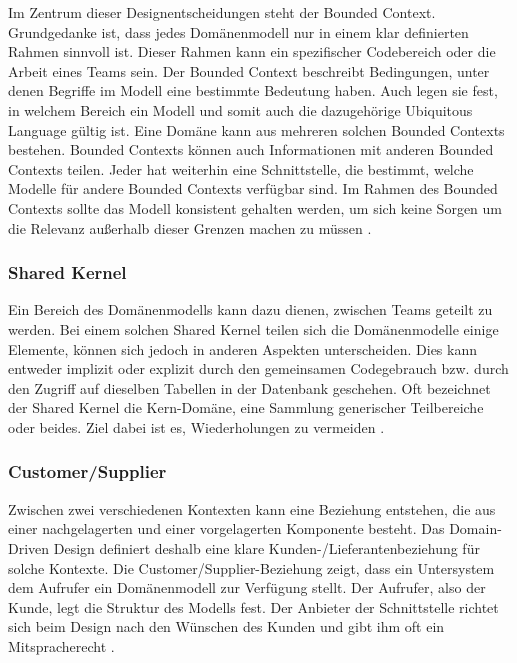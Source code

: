 {Im Zentrum dieser Designentscheidungen steht der \glqq Bounded Context\grqq{}. Grundgedanke ist, dass jedes Domänenmodell nur in einem klar definierten Rahmen sinnvoll ist. Dieser Rahmen kann ein spezifischer Codebereich oder die Arbeit eines Teams sein. Der Bounded Context beschreibt Bedingungen, unter denen Begriffe im Modell eine bestimmte Bedeutung haben. Auch legen sie fest, in welchem Bereich ein Modell und somit auch die dazugehörige Ubiquitous Language gültig ist. Eine Domäne kann aus mehreren solchen Bounded Contexts bestehen. Bounded Contexts können auch Informationen mit anderen Bounded Contexts teilen. Jeder hat weiterhin eine Schnittstelle, die bestimmt, welche Modelle für andere Bounded Contexts verfügbar sind. Im Rahmen des Bounded Contexts sollte das Modell konsistent gehalten werden, um sich keine Sorgen um die Relevanz außerhalb dieser Grenzen machen zu müssen \cite[S. 45]{wolff} \cite[S.57]{newman} \cite[S. 335 - 340]{evans} \cite[S.64-65]{dowalil}.

\subsubsection{Shared Kernel}

Ein Bereich des Domänenmodells kann dazu dienen, zwischen Teams geteilt zu werden. Bei einem solchen \glqq Shared Kernel\grqq{} teilen sich die Domänenmodelle einige Elemente, können sich jedoch in anderen Aspekten unterscheiden. Dies kann entweder implizit oder explizit durch den gemeinsamen Codegebrauch bzw. durch den Zugriff auf dieselben Tabellen in der Datenbank geschehen. Oft bezeichnet der Shared Kernel die Kern-Domäne, eine Sammlung generischer Teilbereiche oder beides. Ziel dabei ist es, Wiederholungen zu vermeiden \cite[S. 354 - 355]{evans} \cite[S. 45]{wolff} \cite[S.65]{dowalil}.

\subsubsection{Customer/Supplier}

Zwischen zwei verschiedenen Kontexten kann eine Beziehung entstehen, die aus einer nachgelagerten und einer vorgelagerten Komponente besteht. Das Domain-Driven Design definiert deshalb eine klare Kunden-/Lieferantenbeziehung für solche Kontexte. Die \glqq Customer/Supplier\grqq{}-Beziehung zeigt, dass ein Untersystem dem Aufrufer ein Domänenmodell zur Verfügung stellt. Der Aufrufer, also der Kunde, legt die Struktur des Modells fest. Der Anbieter der Schnittstelle richtet sich beim Design nach den Wünschen des Kunden und gibt ihm oft ein Mitspracherecht \cite[S. 356 - 360]{evans} \cite[S. 45,47]{wolff} \cite[S.66]{dowalil}.

}
